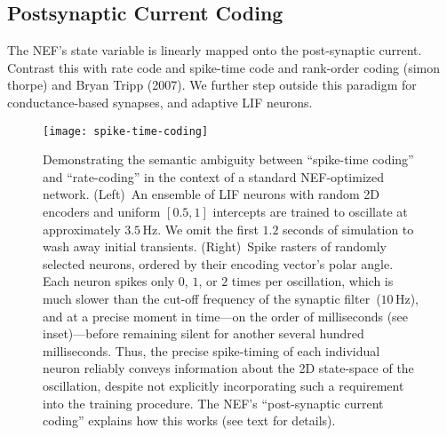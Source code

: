 
\iffalse
\subsection{Continuous-Time and Discrete-Time}

The idea that both continuous-time and discrete-time dynamics play important roles at different time-scales, both in terms of the dominant dynamics and in terms of the desired computation.
It is also important to consider both for neuromorphic hardware.
\fi

\subsection{Postsynaptic Current Coding}
\label{sec:psc-coding}

The NEF's state variable is linearly mapped onto the post-synaptic current.
Contrast this with rate code and spike-time code and rank-order coding (simon thorpe) and Bryan Tripp (2007).
We further step outside this paradigm for conductance-based synapses, and adaptive LIF neurons.


\begin{figure}
    \centering
    \texttt{[image: spike-time-coding]}
     
    \caption{\label{fig:spike-time-coding} 
      Demonstrating the semantic ambiguity between ``spike-time coding'' and ``rate-coding'' in the context of a standard NEF-optimized network.
      (Left)~An ensemble of  LIF neurons with random 2D encoders and uniform $[0.5, 1]$ intercepts are trained to oscillate at approximately $3.5$\,Hz.
      We omit the first $1.2$ seconds of simulation to wash away initial transients.
      (Right)~Spike rasters of  randomly selected neurons, ordered by their encoding vector's polar angle.
      Each neuron spikes only $0$, $1$, or $2$ times per oscillation, which is much slower than the cut-off frequency of the synaptic filter~($10$\,Hz), and at a precise moment in time---on the order of milliseconds (see inset)---before remaining silent for another several hundred milliseconds.
      Thus, the precise spike-timing of each individual neuron reliably conveys information about the 2D state-space of the oscillation, despite not explicitly incorporating such a requirement into the training procedure.
      The NEF's ``post-synaptic current coding'' explains how this works (see text for details).
    }
\end{figure}

